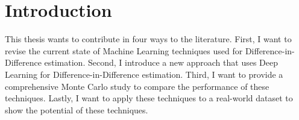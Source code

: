 \section{Introduction}











%
This thesis wants to contribute in four ways to the literature. %
First, I want to revise the current state of Machine Learning techniques used for Difference-in-Difference estimation.%
Second, I introduce a new approach that uses Deep Learning for Difference-in-Difference estimation.%
Third, I want to provide a comprehensive Monte Carlo study to compare the performance of these techniques.%
Lastly, I want to apply these techniques to a real-world dataset to show the potential of these techniques.%


